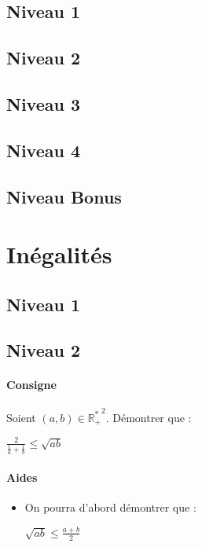 \documentclass[a4paper]{report}
\newcounter{exnumber}
\begin{document}
			\subsection{Niveau 1}
		
			\subsection{Niveau 2}
		
			\subsection{Niveau 3}
			
			\subsection{Niveau 4}
			
			\subsection{Niveau Bonus}
	
		\section{Inégalités}	
		
			\subsection{Niveau 1}
		
			\subsection{Niveau 2}
			\begin{tcolorbox}[colback=white,colframe=black,title=Exercice n°\arabic{exnumber} - Inégalités et fractions]
				\paragraph{Consigne}
						Soient $(a,b) \in \mathbb{R_+^*}^2$. Démontrer que :
						\begin{center}
							$\frac{2}{\frac{1}{a} + \frac{1}{b}} \leqslant \sqrt{ab}$
						\end{center}
					
				\tcblower					
					
					\paragraph{Aides}
						\begin{itemize}
							\item On pourra d'abord démontrer que :
							\begin{center}
								$\sqrt{ab} \leqslant \frac{a+b}{2}$					
							\end{center}										
						\end{itemize}	
				\end{tcolorbox}	
				\addtocounter{exnumber}{1}										
		
\end{document}
